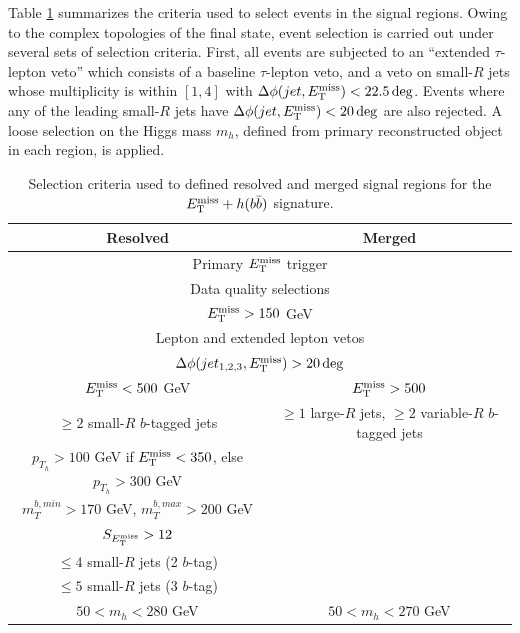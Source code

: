 Table \ref{tab:Hbb-selection} summarizes the criteria used to select events in the signal regions. Owing to the complex topologies of the final state, event selection is carried out under several sets of selection criteria. First, all events are subjected to an ``extended $\tau$-lepton veto'' which consists of a baseline $\tau$-lepton veto, and a veto on small-$R$ jets whose multiplicity is within $[1,4]$ with $\Delta \phi(jet, E_{\mathrm{T}}^{\mathrm{miss}})<22.5\deg$. Events where any of the leading small-$R$ jets have $\Delta \phi(jet, E_{\mathrm{T}}^{\mathrm{miss}})<20\deg$ are also rejected. A loose selection on the Higgs mass $m_h$, defined from primary reconstructed object in each region, is applied. 

\begin{table}[h!]
    \centering
    \begin{tabular}{|c|c|}
    \hline
     \textbf{Resolved}    &  \textbf{Merged} \\
     \hline
      \multicolumn{2}{|c|}{Primary $E_{\mathrm{T}}^{\mathrm{miss}}$ trigger}  \\ \hline
      \multicolumn{2}{|c|}{Data quality selections}    \\ \hline
       \multicolumn{2}{|c|}{$E_{\mathrm{T}}^{\mathrm{miss}}>150$ GeV}  \\ \hline
        \multicolumn{2}{|c|}{Lepton and extended lepton vetos} \\ \hline
        \multicolumn{2}{|c|}{$\Delta\phi(jet_{1,2,3}, E_{\mathrm{T}}^{\mathrm{miss}})>20\deg$} \\  \hline
        $E_{\mathrm{T}}^{\mathrm{miss}}<500$ GeV & $E_{\mathrm{T}}^{\mathrm{miss}}>500$  \\ \hline
        $\ge 2$ small-$R$ $b$-tagged jets & $\ge 1$ large-$R$ jets, $\ge 2$ variable-$R$ $b$-tagged jets \\ \hline
        $p_{T_h} > 100 $ GeV if $E_{\mathrm{T}}^{\mathrm{miss}}<350$, else $p_{T_h} > 300 $ GeV & \\ \hline
        $m_T^{b,min}>170$ GeV, $m_T^{b,max}>200$ GeV  & \\ \hline
        $S_{E_{\mathrm{T}}^{\mathrm{miss}}} > 12$ & \\ \hline
        $\le 4$ small-$R$ jets (2 $b$-tag) & \\ \hline
        $\le 5$ small-$R$ jets (3 $b$-tag) &  \\ \hline
        $50<m_h < 280$ GeV & $50<m_h < 270$ GeV \\
    \hline
    \hline
    \end{tabular}
    \caption{Selection criteria used to defined resolved and merged signal regions for the $E_{\mathrm{T}}^{\mathrm{miss}}+h(b\bar{b})$ signature.}
    \label{tab:Hbb-selection}
\end{table}

